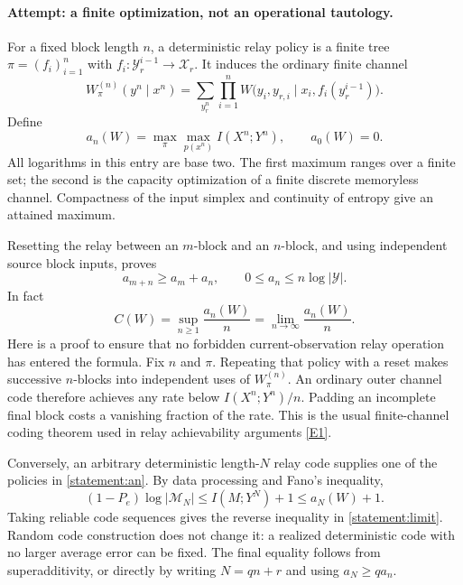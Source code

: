 \documentclass[11pt,a4paper]{article}
\newcommand{\eref}[2]{\hyperlink{extra:#1:#2}{[E#2]}}
\numberwithin{equation}{section}
\begin{document}
\paragraph{Attempt: a finite optimization, not an operational tautology.}
For a fixed block length $n$, a deterministic relay policy is a finite
tree $\pi=(f_i)_{i=1}^n$ with
$f_i:\mathcal Y_r^{i-1}\to\mathcal X_r$. It induces the ordinary finite
channel
\begin{equation}
 W_\pi^{(n)}(y^n\mid x^n)
 =\sum_{y_r^n}\prod_{i=1}^n
 W\bigl(y_i,y_{r,i}\mid x_i,f_i(y_r^{i-1})\bigr).
\end{equation}
Define
\begin{equation}\label{statement:an}
 a_n(W)=\max_{\pi}\max_{p(x^n)}I(X^n;Y^n),\qquad a_0(W)=0.
\end{equation}
All logarithms in this entry are base two. The first maximum ranges
over a finite set; the second is the capacity optimization of a finite
discrete memoryless channel. Compactness of the input simplex and
continuity of entropy give an attained maximum.

Resetting the relay between an $m$-block and an $n$-block, and using
independent source block inputs, proves
\begin{equation}
 a_{m+n}\geq a_m+a_n,\qquad 0\leq a_n\leq n\log|\mathcal Y|.
\end{equation}
In fact
\begin{equation}\label{statement:limit}
 C(W)=\sup_{n\geq1}\frac{a_n(W)}n
     =\lim_{n\to\infty}\frac{a_n(W)}n.
\end{equation}
Here is a proof to ensure that no forbidden current-observation relay
operation has entered the formula. Fix $n$ and $\pi$. Repeating that
policy with a reset makes successive $n$-blocks into independent uses
of $W_\pi^{(n)}$. An ordinary outer channel code therefore achieves
any rate below $I(X^n;Y^n)/n$. Padding an incomplete final block costs
a vanishing fraction of the rate. This is the usual finite-channel
coding theorem used in relay achievability arguments
\eref{statement}{1}.

Conversely, an arbitrary deterministic length-$N$ relay code supplies
one of the policies in \eqref{statement:an}. By data processing and Fano's
inequality,
\begin{equation}
 (1-P_e)\log|\mathcal M_N|\leq I(M;Y^N)+1
 \leq a_N(W)+1.
\end{equation}
Taking reliable code sequences gives the reverse inequality in
\eqref{statement:limit}. Random code construction does not change it: a
realized deterministic code with no larger average error can be fixed.
The final equality follows from superadditivity, or directly by
writing $N=qn+r$ and using $a_N\geq q a_n$.
\end{document}
